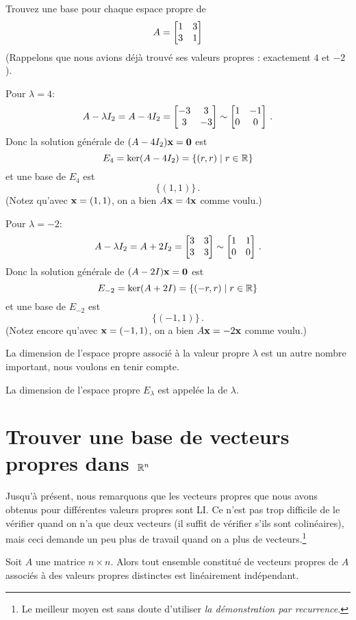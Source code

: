 \begin{myprob} Trouvez une base pour chaque espace propre de 
$$
A = \left[ \begin{matrix} 1 & 3 \\ 3 & 1 \end{matrix} \right]
$$
(Rappelons que nous avions déjà trouvé ses valeurs propres : exactement $4$ et $-2$).

\begin{mysol}
Pour $\lambda = 4$:
$$
A-\lambda I_2 = A-4I_2 = \left[ \begin{matrix} -3&3\\3&-3 \end{matrix} \right] \sim \left[ \begin{matrix} 1 & -1\\0&0 \end{matrix} \right]\,.
$$
Donc la solution générale de $(A-4I_2)\mathbf{x} = \mathbf{0}$ est
$$
E_4 = \ker(A-4I_2) = \{(r,r) \mid r\in\mathbb{R}\}
$$
et une base de $E_4$ est
$$
\{ (1,1) \}\,.
$$
(Notez qu'avec $\mathbf{x} = (1,1)$, on a bien $A\mathbf{x} = 4\mathbf{x}$ comme voulu.)


Pour $\lambda = -2$:
$$
 A-\lambda I_2 = A+2I_2 = \left[ \begin{matrix} 3&3\\3&3 \end{matrix} \right] \sim \left[ \begin{matrix} 1&1\\0&0 \end{matrix} \right]\,.
$$
Donc la solution générale de $(A-2I)\mathbf{x} = \mathbf{0}$ est
$$
E_{-2} = \ker(A+2I) = \{(-r,r) \mid r\in\mathbb{R}\}
$$
et une base de $E_{-2}$ est
$$
\{ (-1,1) \}\,.
$$
(Notez encore qu'avec $\mathbf{x} = (-1,1)$, on a bien $A\mathbf{x} = -2\mathbf{x}$ comme voulu.)
\end{mysol}\end{myprob}


La dimension de l'espace propre associé à la valeur propre $\lambda$ est un autre nombre important, nous voulons en tenir compte.

\begin{definition}
La dimension de l'espace propre $E_\lambda$ est appelée la
 de $\lambda$.
\end{definition}

\section{Trouver une base de vecteurs propres dans $\mathbb{R}^n$}

Jusqu'à présent, nous remarquons que les vecteurs propres que nous avons obtenus pour 
différentes valeurs propres sont LI.
Ce n'est pas trop difficile de le vérifier quand on n'a que deux vecteurs (il suffit de vérifier s'ils sont colinéaires), mais ceci demande un peu plus de travail quand on a plus de vecteurs.\footnote{Le meilleur moyen est sans doute d'utiliser {\it la démonstration par recurrence}.}  

\begin{theorem} \label{theo: Les vecteurs propres sont LI quand les valeurs propres sont distinctes}
Soit $A$ une matrice $n\times n$.  Alors tout ensemble constitué
de vecteurs propres de $A$ associ\'es à des valeurs propres distinctes
est linéairement indépendant.
\end{theorem}

